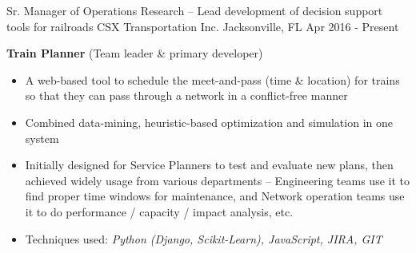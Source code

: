 

\begin{cventries}


\cventry
{Sr. Manager of Operations Research \tiny{-- Lead development of decision support tools for railroads}}     %
{CSX Transportation Inc.}                %
{Jacksonville, FL}                       %
{Apr 2016 - Present}                     %
{
    \begin{cvitems}
        \item {
\textbf{Train Planner} {(Team leader \& primary developer) }   
\begin{itemize}
    \item  A web-based tool to schedule the meet-and-pass (time \& location) for trains so that they can pass through a network in a conflict-free manner
    \item  Combined data-mining, heuristic-based optimization and simulation in one system
    \item  Initially designed for Service Planners to test and evaluate new plans, then achieved widely usage from various departments -- Engineering teams use it to find proper time windows for maintenance, and Network operation teams use it to do performance / capacity / impact analysis, etc.
    \item  Techniques used: \textit{Python (Django, Scikit-Learn), JavaScript, JIRA, GIT}
\end{itemize}           
        }
    \end{cvitems}%
}


\end{cventries}
